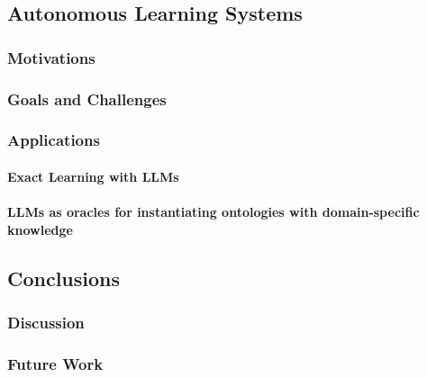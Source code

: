 \documentclass[12pt,a4paper,openright,twoside]{book}
\begin{document}

\chapter{Autonomous Learning Systems}\label{ch:autonomous-learning-systems}

\section{Motivations}\label{sec:motivations}

\section{Goals and Challenges}\label{sec:goals-and-challenges}

\section{Applications}\label{sec:applications}

\subsection{Exact Learning with \acp{LLM}}\label{subsec:exact-learning-with-ac{llm}}

\subsection{\Aclp{LLM} as oracles for instantiating ontologies with domain-specific knowledge}\label{subsec:llm-as-oracles-for-instantiating-ontologies-with-domain-specific-knowledge}


\chapter{Conclusions}\label{ch:conclusions}

\section{Discussion}\label{sec:discussion}

\section{Future Work}\label{sec:future-work}


\backmatter

\part*{}

\nocite{*} %


\end{document}
